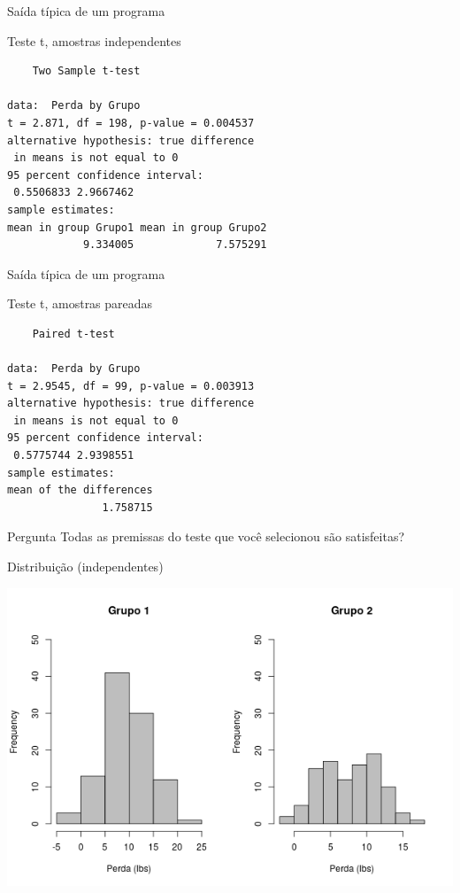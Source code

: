 \documentclass{beamer}
\begin{document}

\begin{frame}[fragile, label=t-indep]{Saída típica de um programa}
  \begin{block}{Teste t, amostras independentes}
    \footnotesize
    \begin{verbatim}
	Two Sample t-test

data:  Perda by Grupo
t = 2.871, df = 198, p-value = 0.004537
alternative hypothesis: true difference
 in means is not equal to 0
95 percent confidence interval:
 0.5506833 2.9667462
sample estimates:
mean in group Grupo1 mean in group Grupo2 
            9.334005             7.575291 
\end{verbatim}
  \end{block}
\end{frame}

\begin{frame}[fragile]{Saída típica de um programa}
  \begin{block}{Teste t, amostras pareadas}
    \footnotesize
    \begin{verbatim}
	Paired t-test

data:  Perda by Grupo
t = 2.9545, df = 99, p-value = 0.003913
alternative hypothesis: true difference
 in means is not equal to 0
95 percent confidence interval:
 0.5775744 2.9398551
sample estimates:
mean of the differences 
               1.758715
\end{verbatim}
  \end{block}
\end{frame}


\begin{frame}{}
  \begin{block}{Pergunta}
    Todas as premissas do teste que você selecionou são satisfeitas?
  \end{block}
\end{frame}

\begin{frame}{Distribuição (independentes)}
  \begin{center}
    \includegraphics[height=\textheight]{Cap23-25/obesidade-hist2}
  \end{center}
\end{frame}
\end{document}
